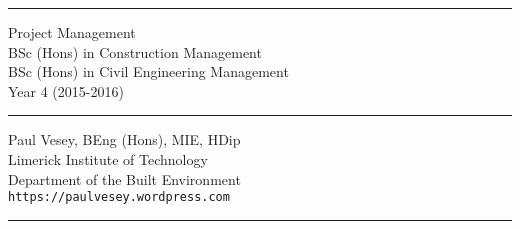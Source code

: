
\thispagestyle{empty} %


\hrule

\vspace*{0.7cm} %


\begin{flushright}
\Huge Project Management \\
\vspace*{0.7cm}
\Large BSc (Hons) in Construction Management\\
BSc (Hons) in Civil Engineering Management\\
Year 4 (2015-2016)
\end{flushright}

\vspace*{0.7cm} %
	
\normalsize

\hrule


\vfill %


{\centering \large 
\hfill Paul Vesey, \scriptsize BEng (Hons), MIE, HDip\normalsize \\
\hfill Limerick Institute of Technology \\
\hfill Department of the Built Environment \\
\hfill \texttt{https://paulvesey.wordpress.com} \\
\vspace*{0.7cm} 
\hrule} %


\clearpage %
